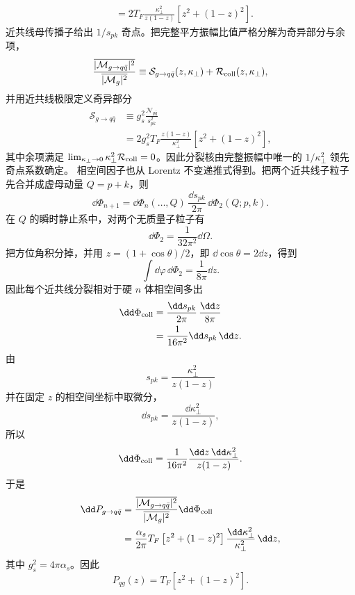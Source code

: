 \begin{derivation}
\begin{align*}
 &=2T_F\frac{\kappa_\perp^2}{z(1-z)}
 \left[z^2+(1-z)^2\right].
\end{align*}
近共线母传播子给出 $1/s_{pk}$ 奇点。把完整平方振幅比值严格分解为奇异部分与余项，
\begin{equation*}
 \frac{\overline{|\mathcal M_{g\to q\bar q}|^2}}
 {\overline{|\mathcal M_{g}|^2}}
 \equiv
 \mathcal S_{g\to q\bar q}(z,\kappa_\perp)
 +\mathcal R_{\rm coll}(z,\kappa_\perp),
\end{equation*}
并用近共线极限定义奇异部分
\begin{align*}
 \mathcal S_{g\to q\bar q}
 &\equiv
 g_s^2\frac{\mathcal N_{q\bar q}}{s_{pk}^2}\\
 &=2g_s^2T_F
 \frac{z(1-z)}{\kappa_\perp^2}
 \left[z^2+(1-z)^2\right],
\end{align*}
其中余项满足 $\lim_{\kappa_\perp\to0}\kappa_\perp^2\mathcal R_{\rm coll}=0$。因此分裂核由完整振幅中唯一的 $1/\kappa_\perp^2$ 领先奇点系数确定。
相空间因子也从 Lorentz 不变递推式得到。把两个近共线子粒子先合并成虚母动量 $Q=p+k$，则
\begin{equation*}
 \dd\Phi_{n+1}
 =\dd\Phi_n(\ldots,Q)\,
 \frac{\dd s_{pk}}{2\pi}\,
 \dd\Phi_2(Q;p,k).
\end{equation*}
在 $Q$ 的瞬时静止系中，对两个无质量子粒子有
\begin{equation*}
 \dd\Phi_2
 =\frac1{32\pi^2}\dd\Omega.
\end{equation*}
把方位角积分掉，并用 $z=(1+\cos\theta)/2$，即 $\dd\cos\theta=2\dd z$，得到
\begin{equation*}
 \int\dd\varphi\,\dd\Phi_2
 =\frac1{8\pi}\dd z.
\end{equation*}
因此每个近共线分裂相对于硬 $n$ 体相空间多出
\begin{align*}
 \dd\Phi_{\rm coll}
 &=\frac{\dd s_{pk}}{2\pi}\,
 \frac{\dd z}{8\pi}\\
 &=\frac1{16\pi^2}\dd s_{pk}\,\dd z.
\end{align*}
由
\begin{equation*}
 s_{pk}=\frac{\kappa_\perp^2}{z(1-z)}
\end{equation*}
并在固定 $z$ 的相空间坐标中取微分，
\begin{equation*}
 \dd s_{pk}
 =\frac{\dd\kappa_\perp^2}{z(1-z)},
\end{equation*}
所以
\begin{equation*}
 \dd\Phi_{\rm coll}
 =\frac{1}{16\pi^2}
 \frac{\dd z\,\dd\kappa_\perp^2}{z(1-z)}.
\end{equation*}
于是
\begin{align*}
 \dd P_{g\to q\bar q}
 &=\frac{\overline{|\mathcal M_{g\to q\bar q}|^2}}
 {\overline{|\mathcal M_{g}|^2}}
 \dd\Phi_{\rm coll}\\
 &=\frac{\alpha_s}{2\pi}
 T_F\left[z^2+(1-z)^2\right]
 \frac{\dd\kappa_\perp^2}{\kappa_\perp^2}\,\dd z,
\end{align*}
其中 $g_s^2=4\pi\alpha_s$。因此
\begin{equation*}
 P_{qg}(z)=T_F\left[z^2+(1-z)^2\right].
\end{equation*}


\end{derivation}
